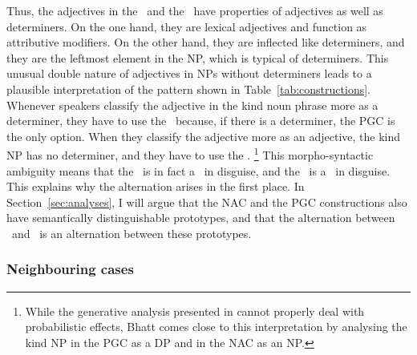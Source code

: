 Thus, the adjectives in the \NACa\ and the \PGCa\ have properties of adjectives as well as determiners.
On the one hand, they are lexical adjectives and function as attributive modifiers.
On the other hand, they are inflected like determiners, and they are the leftmost element in the NP, which is typical of determiners.
This unusual double nature of adjectives in NPs without determiners leads to a plausible interpretation of the pattern shown in Table~\ref{tab:constructions}.
Whenever speakers classify the adjective in the kind noun phrase more as a determiner, they have to use the \PGCa\ because, if there is a determiner, the PGC is the only option.
When they classify the adjective more as an adjective, the kind NP has no determiner, and they have to use the \NACa.%
\footnote{While the generative analysis presented in \cite{Bhatt1990} cannot properly deal with probabilistic effects, Bhatt comes close to this interpretation by analysing the kind NP in the PGC as a DP and in the NAC as an NP.}
This morpho-syntactic ambiguity means that the \NACa\ is in fact a \NACb\ in disguise, and the \PGCa\ is a \PGCd\ in disguise.
This explains why the alternation arises in the first place.
In Section~\ref{sec:analyses}, I will argue that the NAC and the PGC constructions also have semantically distinguishable prototypes, and that the alternation between \PGCa\ and \NACa\ is an alternation between these prototypes.

\subsubsection{Neighbouring cases}
\label{sec:neighbouringcases}

% 
%

